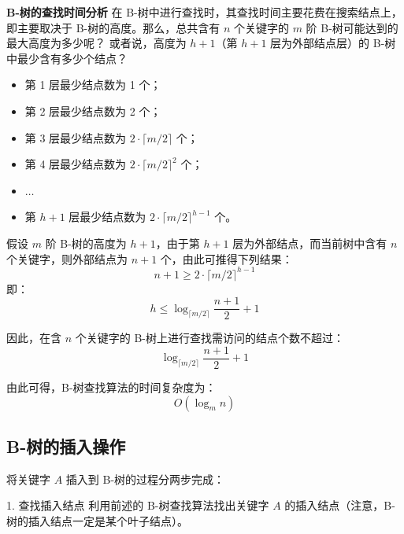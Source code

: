 \documentclass[lang=cn,newtx,10pt,scheme=chinese]{../elegantbook}
\begin{document}
\textbf{B-树的查找时间分析}  
在 B-树中进行查找时，其查找时间主要花费在搜索结点上，即主要取决于 B-树的高度。那么，总共含有 $n$ 个关键字的 $m$ 阶 B-树可能达到的最大高度为多少呢？
或者说，高度为 $h+1$（第 $h+1$ 层为外部结点层）的 B-树中最少含有多少个结点？

\begin{itemize}
  \item 第 1 层最少结点数为 1 个；
  \item 第 2 层最少结点数为 2 个；
  \item 第 3 层最少结点数为 $2 \cdot \lceil m/2 \rceil$ 个；
  \item 第 4 层最少结点数为 $2 \cdot \lceil m/2 \rceil^2$ 个；
  \item $\dots$
  \item 第 $h+1$ 层最少结点数为 $2 \cdot \lceil m/2 \rceil^{h-1}$ 个。
\end{itemize}

假设 $m$ 阶 B-树的高度为 $h+1$，由于第 $h+1$ 层为外部结点，而当前树中含有 $n$ 个关键字，则外部结点为 $n+1$ 个，由此可推得下列结果：
\[
n+1 \geq 2 \cdot \lceil m/2 \rceil^{h-1}
\]
即：
\[
h \leq \log_{\lceil m/2 \rceil} \frac{n+1}{2} + 1
\]

因此，在含 $n$ 个关键字的 B-树上进行查找需访问的结点个数不超过：
\[
\log_{\lceil m/2 \rceil} \frac{n+1}{2} + 1
\]

由此可得，B-树查找算法的时间复杂度为：
\[
O(\log_m n)
\]
\subsection{B-树的插入操作}

将关键字 $A$ 插入到 B-树的过程分两步完成：

1. 查找插入结点  
   利用前述的 B-树查找算法找出关键字 $A$ 的插入结点（注意，B-树的插入结点一定是某个叶子结点）。
\end{document}
